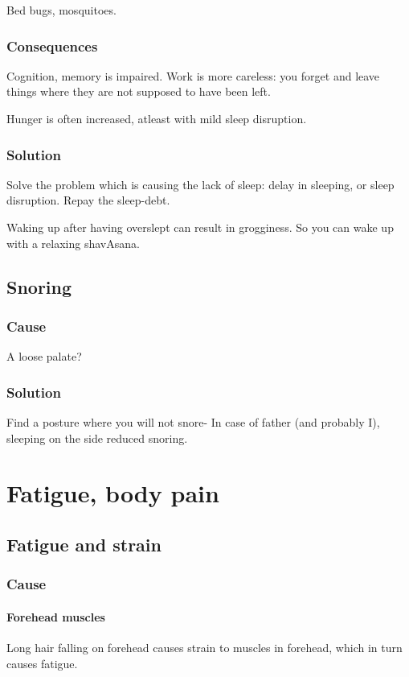 \documentclass[oneside, article]{memoir}
\begin{document}
Bed bugs, mosquitoes.

\subsection{Consequences}
Cognition, memory is impaired. Work is more careless: you forget and leave things where they are not supposed to have been left.

Hunger is often increased, atleast with mild sleep disruption.


\subsection{Solution}
Solve the problem which is causing the lack of sleep: delay in sleeping, or sleep disruption. Repay the sleep-debt.

Waking up after having overslept can result in grogginess. So you can wake up with a relaxing shavAsana.


\section{Snoring}
\subsection{Cause}
A loose palate?

\subsection{Solution}
Find a posture where you will not snore- In case of father (and probably I), sleeping on the side reduced snoring.


\chapter{Fatigue, body pain}
\section{Fatigue and strain}
\subsection{Cause}
\subsubsection{Forehead muscles}
Long hair falling on forehead causes strain to muscles in forehead, which in turn causes fatigue.
\end{document}
